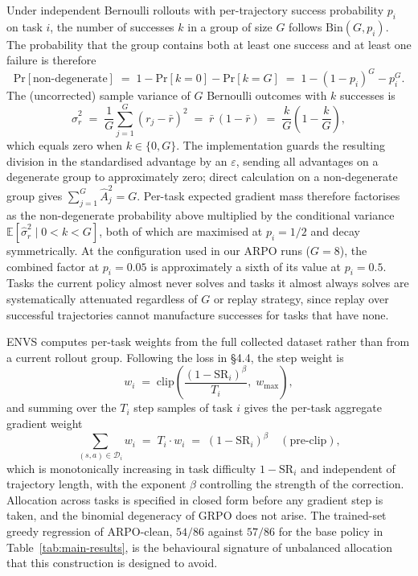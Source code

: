 \documentclass[11pt]{article}
\begin{document}
Under independent Bernoulli rollouts with per-trajectory success
probability $p_i$ on task $i$, the number of successes $k$ in a group of
size $G$ follows $\mathrm{Bin}(G, p_i)$. The probability that the group
contains both at least one success and at least one failure is therefore
\[
    \mathrm{Pr}[\text{non-degenerate}]
    \;=\; 1 - \mathrm{Pr}[k = 0] - \mathrm{Pr}[k = G]
    \;=\; 1 - (1-p_i)^G - p_i^G.
\]
The (uncorrected) sample variance of $G$ Bernoulli outcomes with $k$
successes is
\[
    \hat\sigma_r^2 \;=\; \frac{1}{G}\sum_{j=1}^{G} (r_j - \bar r)^2
    \;=\; \bar r\,(1 - \bar r)
    \;=\; \frac{k}{G}\!\left(1 - \frac{k}{G}\right),
\]
which equals zero when $k \in \{0, G\}$. The implementation guards the
resulting division in the standardised advantage by an $\varepsilon$,
sending all advantages on a degenerate group to approximately zero;
direct calculation on a non-degenerate group gives $\sum_{j=1}^G \hat
A_j^2 = G$. Per-task expected gradient mass therefore factorises as the
non-degenerate probability above multiplied by the conditional variance
$\mathbb{E}[\hat\sigma_r^2 \mid 0 < k < G]$, both of which are maximised
at $p_i = 1/2$ and decay symmetrically. At the configuration used in our
ARPO runs ($G = 8$), the combined factor at $p_i = 0.05$ is approximately
a sixth of its value at $p_i = 0.5$. Tasks the current policy almost
never solves and tasks it almost always solves are systematically
attenuated regardless of $G$ or replay strategy, since replay over
successful trajectories cannot manufacture successes for tasks that have
none.

\textsc{ENVS} computes per-task weights from the full collected dataset
rather than from a current rollout group. Following the loss in \S4.4,
the step weight is
\[
    w_i
    \;=\;
    \mathrm{clip}\!\left(
        \frac{(1 - \mathrm{SR}_i)^{\beta}}{T_i},\; w_{\max}
    \right),
\]
and summing over the $T_i$ step samples of task $i$ gives the per-task
aggregate gradient weight
\[
    \sum_{(s, a) \in \mathcal{D}_i} w_i
    \;=\; T_i \cdot w_i
    \;=\; (1 - \mathrm{SR}_i)^{\beta}
    \quad (\text{pre-clip}),
\]
which is monotonically increasing in task difficulty $1 - \mathrm{SR}_i$
and independent of trajectory length, with the exponent $\beta$
controlling the strength of the correction. Allocation across tasks is
specified in closed form before any gradient step is taken, and the
binomial degeneracy of GRPO does not arise. The trained-set greedy
regression of ARPO-clean, $54/86$ against $57/86$ for the base policy in
Table~\ref{tab:main-results}, is the behavioural signature of unbalanced
allocation that this construction is designed to avoid.
\end{document}
